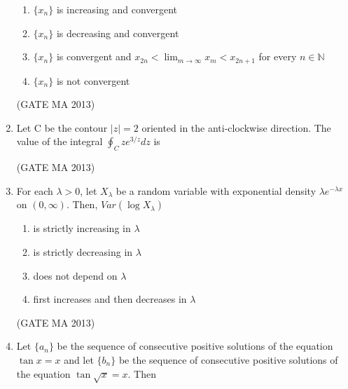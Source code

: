 \documentclass[journal,12pt,onecolumn]{IEEEtran}
\theoremstyle{remark}
\begin{document}
\begin{enumerate}
    \begin{enumerate}
        \item $\{x_n\}$ is increasing and convergent
        \item $\{x_n\}$ is decreasing and convergent
        \item $\{x_n\}$ is convergent and $x_{2n} < \lim_{m \to \infty} x_m < x_{2n+1}$ for every $n \in \mathbb{N}$
        \item $\{x_n\}$ is not convergent
    \end{enumerate}
    \hfill (GATE MA 2013)
    \item Let C be the contour $|z|=2$ oriented in the anti-clockwise direction. The value of the integral $\oint_C z e^{3/z} dz$ is
    \begin{enumerate}
    \end{enumerate}
     \hfill (GATE MA 2013)
    \item For each $\lambda > 0$, let $X_{\lambda}$ be a random variable with exponential density $\lambda e^{-\lambda x}$ on $(0, \infty)$. Then, $Var(\log X_{\lambda})$
    \begin{enumerate}
        \item is strictly increasing in $\lambda$
        \item is strictly decreasing in $\lambda$
        \item does not depend on $\lambda$
        \item first increases and then decreases in $\lambda$
    \end{enumerate}
    \hfill (GATE MA 2013)
    \item Let $\{a_n\}$ be the sequence of consecutive positive solutions of the equation $\tan x = x$ and let $\{b_n\}$ be the sequence of consecutive positive solutions of the equation $\tan \sqrt{x} = x$. Then
    \begin{enumerate}
\end{enumerate}
\end{enumerate}
\end{document}
